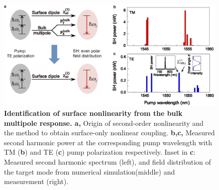 \documentclass[a4paper,8pt,hyperref, twocolumn, aps, prl]{article}
\begin{document}
\begin{figure}[!ht]
\centering
\includegraphics[width=16cm]{Fig3new.eps}
\caption{\textbf{Identification of surface nonlinearity from the bulk multipole response. a, }Origin of second-order nonlinearity and the method to obtain surface-only nonlinear coupling. \textbf{b,c,} Measured second harmonic power at the corresponding pump wavelength with TM (\textbf{b}) and TE (\textbf{c}) pump polarization respectively. Inset in \textbf{c}: Measured second harmonic spectrum (left), and field distribution of the target mode from numerical simulation(middle) and measurement (right).}
\label{pic:Fig3}
\end{figure}
\end{document}
